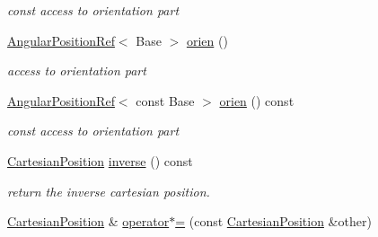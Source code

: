 \begin{DoxyCompactItemize}
\begin{DoxyCompactList}\small\item\em const access to orientation part \end{DoxyCompactList}\item 
\hyperlink{classow__core_1_1AngularPositionRef}{Angular\+Position\+Ref}$<$ Base $>$ \hyperlink{classow__core_1_1CartesianPosition_a680a6d47482765fe6d1fef447b3b8e53}{orien} ()\hypertarget{classow__core_1_1CartesianPosition_a680a6d47482765fe6d1fef447b3b8e53}{}\label{classow__core_1_1CartesianPosition_a680a6d47482765fe6d1fef447b3b8e53}

\begin{DoxyCompactList}\small\item\em access to orientation part \end{DoxyCompactList}\item 
\hyperlink{classow__core_1_1AngularPositionRef}{Angular\+Position\+Ref}$<$ const Base $>$ \hyperlink{classow__core_1_1CartesianPosition_a6df89dcb5404d0db3ae92b31cdfe399a}{orien} () const \hypertarget{classow__core_1_1CartesianPosition_a6df89dcb5404d0db3ae92b31cdfe399a}{}\label{classow__core_1_1CartesianPosition_a6df89dcb5404d0db3ae92b31cdfe399a}

\begin{DoxyCompactList}\small\item\em const access to orientation part \end{DoxyCompactList}\item 
\hyperlink{classow__core_1_1CartesianPosition}{Cartesian\+Position} \hyperlink{classow__core_1_1CartesianPosition_a161b9f3db0228627694fd81ecc8ba8dd}{inverse} () const \hypertarget{classow__core_1_1CartesianPosition_a161b9f3db0228627694fd81ecc8ba8dd}{}\label{classow__core_1_1CartesianPosition_a161b9f3db0228627694fd81ecc8ba8dd}

\begin{DoxyCompactList}\small\item\em return the inverse cartesian position. \end{DoxyCompactList}\item 
\hyperlink{classow__core_1_1CartesianPosition}{Cartesian\+Position} \& \hyperlink{classow__core_1_1CartesianPosition_ac17957b81c28189aef48c7bb45fbbb94}{operator$\ast$=} (const \hyperlink{classow__core_1_1CartesianPosition}{Cartesian\+Position} \&other)\hypertarget{classow__core_1_1CartesianPosition_ac17957b81c28189aef48c7bb45fbbb94}{}\label{classow__core_1_1CartesianPosition_ac17957b81c28189aef48c7bb45fbbb94}


\end{DoxyCompactItemize}
